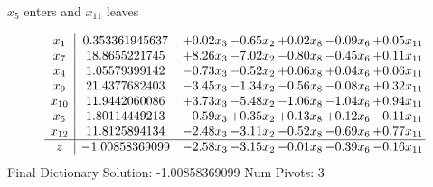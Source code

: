 \documentclass[9pt]{article}
\begin{document}
 $ x_{5} $ enters and $ x_{11} $ leaves 

 \[\begin{array}{c| c c@{\hskip 2pt} c@{\hskip 2pt} c@{\hskip 2pt} c@{\hskip 2pt} c@{\hskip 2pt} }
 x_{1}   &  0.353361945637 & +  0.02 x_{3} & -0.65 x_{2} & +  0.02 x_{8} & -0.09 x_{6} & +  0.05 x_{11}\\
 x_{7}   &  18.8655221745 & +  8.26 x_{3} & -7.02 x_{2} & -0.80 x_{8} & -0.45 x_{6} & +  0.11 x_{11}\\
 x_{4}   &  1.05579399142 & -0.73 x_{3} & -0.52 x_{2} & +  0.06 x_{8} & +  0.04 x_{6} & +  0.06 x_{11}\\
 x_{9}   &  21.4377682403 & -3.45 x_{3} & -1.34 x_{2} & -0.56 x_{8} & -0.08 x_{6} & +  0.32 x_{11}\\
 x_{10}   &  11.9442060086 & +  3.73 x_{3} & -5.48 x_{2} & -1.06 x_{8} & -1.04 x_{6} & +  0.94 x_{11}\\
 x_{5}   &  1.80114449213 & -0.59 x_{3} & +  0.35 x_{2} & +  0.13 x_{8} & +  0.12 x_{6} & -0.11 x_{11}\\
 x_{12}   &  11.8125894134 & -2.48 x_{3} & -3.11 x_{2} & -0.52 x_{8} & -0.69 x_{6} & +  0.77 x_{11}\\
\hline
z    &  -1.00858369099 & -2.58 x_{3} & -3.15 x_{2} & -0.01 x_{8} & -0.39 x_{6} & -0.16 x_{11}\\
\end{array}\]
Final Dictionary
Solution:  -1.00858369099
Num Pivots:  3
\end{document}
